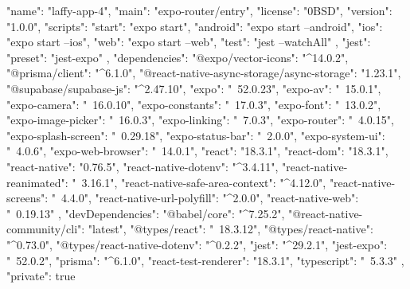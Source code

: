 {
  "name": "laffy-app-4",
  "main": "expo-router/entry",
  "license": "0BSD",
  "version": "1.0.0",
  "scripts": {
    "start": "expo start",
    "android": "expo start --android",
    "ios": "expo start --ios",
    "web": "expo start --web",
    "test": "jest --watchAll"
  },
  "jest": {
    "preset": "jest-expo"
  },
  "dependencies": {
    "@expo/vector-icons": "^14.0.2",
    "@prisma/client": "^6.1.0",
    "@react-native-async-storage/async-storage": "1.23.1",
    "@supabase/supabase-js": "^2.47.10",
    "expo": "~52.0.23", 
    "expo-av": "~15.0.1",
    "expo-camera": "~16.0.10",
    "expo-constants": "~17.0.3",
    "expo-font": "~13.0.2",
    "expo-image-picker": "~16.0.3",
    "expo-linking": "~7.0.3",
    "expo-router": "~4.0.15",
    "expo-splash-screen": "~0.29.18",
    "expo-status-bar": "~2.0.0",
    "expo-system-ui": "~4.0.6",
    "expo-web-browser": "~14.0.1",
    "react": "18.3.1",
    "react-dom": "18.3.1",
    "react-native": "0.76.5",
    "react-native-dotenv": "^3.4.11",
    "react-native-reanimated": "~3.16.1",
    "react-native-safe-area-context": "^4.12.0",
    "react-native-screens": "~4.4.0",
    "react-native-url-polyfill": "^2.0.0",
    "react-native-web": "~0.19.13"
  },
  "devDependencies": {
    "@babel/core": "^7.25.2",
    "@react-native-community/cli": "latest",
    "@types/react": "~18.3.12",
    "@types/react-native": "^0.73.0",
    "@types/react-native-dotenv": "^0.2.2",
    "jest": "^29.2.1",
    "jest-expo": "~52.0.2",
    "prisma": "^6.1.0",
    "react-test-renderer": "18.3.1",
    "typescript": "~5.3.3"
  },
  "private": true
}
